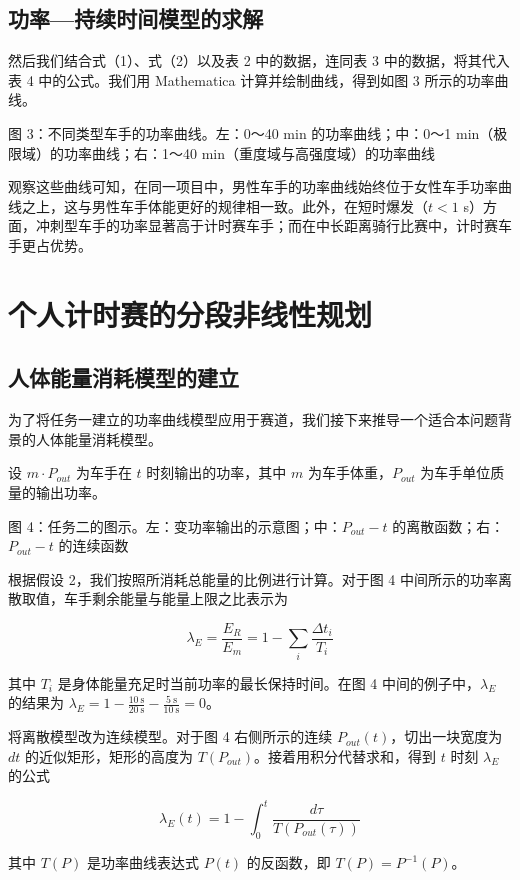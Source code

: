 \documentclass[11pt,a4paper]{ctexart}
\begin{document}
\subsection{功率—持续时间模型的求解}

然后我们结合式（1）、式（2）以及表 2 中的数据，连同表 3 中的数据，将其代入表 4 中的公式。我们用 Mathematica 计算并绘制曲线，得到如图 3 所示的功率曲线。

图 3：不同类型车手的功率曲线。左：0～40 min 的功率曲线；中：0～1 min（极限域）的功率曲线；右：1～40 min（重度域与高强度域）的功率曲线

观察这些曲线可知，在同一项目中，男性车手的功率曲线始终位于女性车手功率曲线之上，这与男性车手体能更好的规律相一致。此外，在短时爆发（$t<1$ s）方面，冲刺型车手的功率显著高于计时赛车手；而在中长距离骑行比赛中，计时赛车手更占优势。

\section{个人计时赛的分段非线性规划}

\subsection{人体能量消耗模型的建立}

为了将任务一建立的功率曲线模型应用于赛道，我们接下来推导一个适合本问题背景的人体能量消耗模型。

设 $m\cdot P_{out}$ 为车手在 $t$ 时刻输出的功率，其中 $m$ 为车手体重，$P_{out}$ 为车手单位质量的输出功率。

图 4：任务二的图示。左：变功率输出的示意图；中：$P_{out}-t$ 的离散函数；右：$P_{out}-t$ 的连续函数

根据假设 2，我们按照所消耗总能量的比例进行计算。对于图 4 中间所示的功率离散取值，车手剩余能量与能量上限之比表示为

\[
\lambda_E=\frac{E_R}{E_m}=1-\sum_{i}\frac{\Delta t_i}{T_i}
\]

其中 $T_i$ 是身体能量充足时当前功率的最长保持时间。在图 4 中间的例子中，$\lambda_E$ 的结果为 $\lambda_E=1-\frac{10\ \mathrm{s}}{20\ \mathrm{s}}-\frac{5\ \mathrm{s}}{10\ \mathrm{s}}=0$。

将离散模型改为连续模型。对于图 4 右侧所示的连续 $P_{out}(t)$，切出一块宽度为 $dt$ 的近似矩形，矩形的高度为 $T(P_{out})$。接着用积分代替求和，得到 $t$ 时刻 $\lambda_E$ 的公式

\[
\lambda_E(t)=1-\int_0^{t}\frac{d\tau}{T\left(P_{out}(\tau)\right)}
\]

其中 $T(P)$ 是功率曲线表达式 $P(t)$ 的反函数，即 $T(P)=P^{-1}(P)$。
\end{document}
